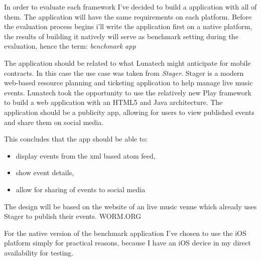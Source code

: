 In order to evaluate each framework I've decided to build a application with all of them. The application will have the same requirements on each platform. Before the evaluation process begins i'll write the application first on a native platform, the results of building it natively will serve as benchmark setting during the evaluation, hence the term: \emph{benchmark app}

The application should be related to what Lunatech might anticipate for mobile contracts. In this case the use case was taken from \emph{Stager}. Stager is a modern web-based resource planning and ticketing application to help manage live music events. Lunatech took the opportunity to use the relatively new Play framework to build a web application with an HTML5 and Java architecture. The application should be a publicity app, allowing for users to view published events and share them on social media.

This concludes that the app should be able to:
\begin{itemize}
	\item display events from the xml based atom feed,
	\item show event details,
	\item allow for sharing of events to social media
\end{itemize}
The design will be based on the website of an live music venue which already uses Stager to publish their events. WORM.ORG

For the native version of the benchmark application I've chosen to use the iOS platform simply for practical reasons, because I have an iOS device in my direct availability for testing.

